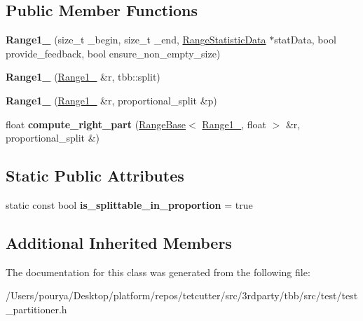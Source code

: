 \subsection*{Public Member Functions}
\begin{DoxyCompactItemize}
\item 
\hypertarget{classtest__partitioner__utils_1_1TestRanges_1_1Range1__999_a8e1701e3c7faee90137ab6f5eba37e9f}{}{\bfseries Range1\+\_} (size\+\_\+t \+\_\+begin, size\+\_\+t \+\_\+end, \hyperlink{structtest__partitioner__utils_1_1RangeStatisticData}{Range\+Statistic\+Data} $\ast$stat\+Data, bool provide\+\_\+feedback, bool ensure\+\_\+non\+\_\+empty\+\_\+size)\label{classtest__partitioner__utils_1_1TestRanges_1_1Range1__999_a8e1701e3c7faee90137ab6f5eba37e9f}

\item 
\hypertarget{classtest__partitioner__utils_1_1TestRanges_1_1Range1__999_a1b47420b2c3078d58178c43a997d880d}{}{\bfseries Range1\+\_} (\hyperlink{classtest__partitioner__utils_1_1TestRanges_1_1Range1__999}{Range1\+\_} \&r, tbb\+::split)\label{classtest__partitioner__utils_1_1TestRanges_1_1Range1__999_a1b47420b2c3078d58178c43a997d880d}

\item 
\hypertarget{classtest__partitioner__utils_1_1TestRanges_1_1Range1__999_a7dee3cf30a1aeaf79690c8426a3f476b}{}{\bfseries Range1\+\_} (\hyperlink{classtest__partitioner__utils_1_1TestRanges_1_1Range1__999}{Range1\+\_} \&r, proportional\+\_\+split \&p)\label{classtest__partitioner__utils_1_1TestRanges_1_1Range1__999_a7dee3cf30a1aeaf79690c8426a3f476b}

\item 
\hypertarget{classtest__partitioner__utils_1_1TestRanges_1_1Range1__999_aa8b4f665d5987c8ecb284e9bdcbd7316}{}float {\bfseries compute\+\_\+right\+\_\+part} (\hyperlink{classtest__partitioner__utils_1_1RangeBase}{Range\+Base}$<$ \hyperlink{classtest__partitioner__utils_1_1TestRanges_1_1Range1__999}{Range1\+\_}, float $>$ \&r, proportional\+\_\+split \&)\label{classtest__partitioner__utils_1_1TestRanges_1_1Range1__999_aa8b4f665d5987c8ecb284e9bdcbd7316}

\end{DoxyCompactItemize}
\subsection*{Static Public Attributes}
\begin{DoxyCompactItemize}
\item 
\hypertarget{classtest__partitioner__utils_1_1TestRanges_1_1Range1__999_a2bf295ae19f57aeda7a9cc44d5364efc}{}static const bool {\bfseries is\+\_\+splittable\+\_\+in\+\_\+proportion} = true\label{classtest__partitioner__utils_1_1TestRanges_1_1Range1__999_a2bf295ae19f57aeda7a9cc44d5364efc}

\end{DoxyCompactItemize}
\subsection*{Additional Inherited Members}


The documentation for this class was generated from the following file\+:\begin{DoxyCompactItemize}
\item 
/\+Users/pourya/\+Desktop/platform/repos/tetcutter/src/3rdparty/tbb/src/test/test\+\_\+partitioner.\+h\end{DoxyCompactItemize}
